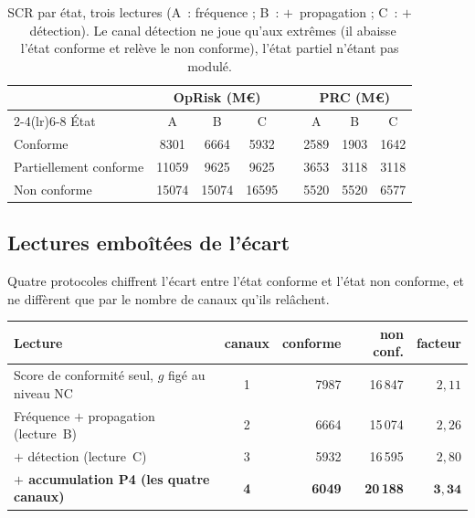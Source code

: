 \begin{table}[htbp]\centering\small
\renewcommand{\arraystretch}{1.25}
\begin{tabular}{@{}l ccc c ccc@{}}
\toprule
& \multicolumn{3}{c}{\textbf{OpRisk} (M\euro)} & & \multicolumn{3}{c}{\textbf{PRC} (M\euro)} \\
\cmidrule(lr){2-4}\cmidrule(lr){6-8}
État & A & B & C & & A & B & C \\
\midrule
Conforme               & 8301  & 6664  & 5932  & & 2589 & 1903 & 1642 \\
Partiellement conforme & 11059 & 9625  & 9625  & & 3653 & 3118 & 3118 \\
Non conforme           & 15074 & 15074 & 16595 & & 5520 & 5520 & 6577 \\
\bottomrule
\end{tabular}
\caption{SCR par état, trois lectures (A~: fréquence ; B~: $+$~propagation ; C~:
$+$~détection). Le canal détection ne joue qu'aux extrêmes (il
abaisse l'état conforme et relève le non conforme), l'état partiel n'étant pas modulé.}
\label{tab:scretat}
\end{table}

\subsection*{Lectures emboîtées de l'écart}
\label{sec:chiffre-de-tete}

Quatre protocoles chiffrent l'écart entre l'état conforme et l'état non conforme, et ne diffèrent
que par le nombre de canaux qu'ils relâchent.

\begin{center}\footnotesize
\renewcommand{\arraystretch}{1.25}
\begin{tabular}{@{}l c r r r@{}}
\toprule
\textbf{Lecture} & \textbf{canaux} & \textbf{conforme} & \textbf{non conf.} & \textbf{facteur} \\
\midrule
Score de conformité seul, $g$ figé au niveau NC & 1 & 7987 & 16\,847 & $2{,}11$ \\
Fréquence $+$ propagation (lecture~B) & 2 & 6664 & 15\,074 & $2{,}26$ \\
$+$ détection (lecture~C) & 3 & 5932 & 16\,595 & $2{,}80$ \\
\textbf{$+$ accumulation P4 (les quatre canaux)} & \textbf{4} & \textbf{6049} & \textbf{20\,188}
& $\mathbf{3{,}34}$ \\
\bottomrule
\end{tabular}
\end{center}

